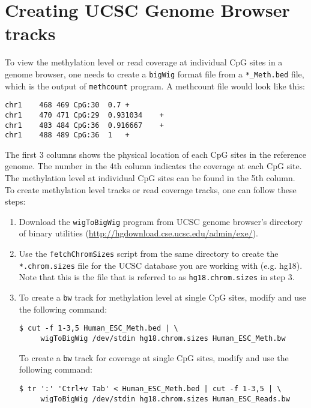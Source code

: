 \documentclass[10pt]{article}
\newcommand{\prog}[1]{\texttt{#1}}
\newcommand{\fn}[1]{\texttt{#1}}
\newcommand{\lit}[1]{\texttt{#1}}
\begin{document}
\section{Creating UCSC Genome Browser tracks}
\label{sec:browser}

To view the methylation level or read coverage at individual CpG sites
in a genome browser, one needs to create a \lit{bigWig} format file
from a \fn{*\_Meth.bed} file, which is the output of \prog{methcount}
program.  A methcount file would look like this:
\begin{verbatim}
chr1	468	469	CpG:30	0.7	+
chr1	470	471	CpG:29	0.931034	+
chr1	483	484	CpG:36	0.916667	+
chr1	488	489	CpG:36	1	+
\end{verbatim}
The first 3 columns shows the physical location of each CpG sites in
the reference genome. The number in the 4th column indicates the
coverage at each CpG site. The methylation level at individual CpG
sites can be found in the 5th column. To create methylation level
tracks or read coverage tracks, one can follow these steps:
\begin{enumerate}
\item Download the \prog{wigToBigWig} program from UCSC genome
  browser's directory of binary utilities
  (\url{http://hgdownload.cse.ucsc.edu/admin/exe/}).
\item Use the \fn{fetchChromSizes} script from the same directory to
  create the \fn{*.chrom.sizes} file for the UCSC database you are
  working with (e.g. hg18). Note that this is the file that is
  referred to as \fn{hg18.chrom.sizes} in step 3.
\item To create a \fn{bw} track for methylation level at single CpG
  sites, modify and use the following command:
\begin{verbatim}
$ cut -f 1-3,5 Human_ESC_Meth.bed | \
     wigToBigWig /dev/stdin hg18.chrom.sizes Human_ESC_Meth.bw
\end{verbatim}
  To create a \fn{bw} track for coverage at single CpG sites, modify
  and use the following command:
\begin{verbatim}
$ tr ':' 'Ctrl+v Tab' < Human_ESC_Meth.bed | cut -f 1-3,5 | \
     wigToBigWig /dev/stdin hg18.chrom.sizes Human_ESC_Reads.bw
\end{verbatim}
\end{enumerate}
\end{document}
